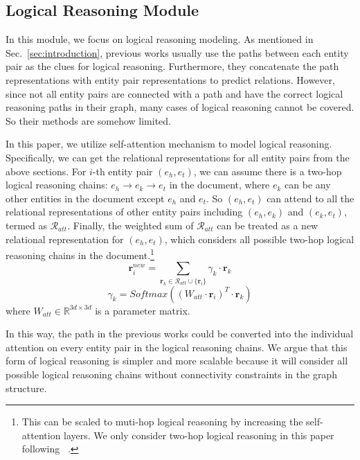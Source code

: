 \documentclass[11pt,a4paper]{article}
\begin{document}
\subsection{Logical Reasoning Module\label{ssec:reasoning}}
In this module, we focus on logical reasoning modeling. As mentioned in Sec.~\ref{sec:introduction}, previous works usually use the paths between each entity pair as the clues for logical reasoning. Furthermore, they concatenate the path representations with entity pair representations to predict relations. However, since not all entity pairs are connected with a path and have the correct logical reasoning paths in their graph, many cases of logical reasoning cannot be covered. So their methods are somehow limited.

In this paper, we utilize self-attention mechanism \citep{transformer} to model logical reasoning. Specifically, we can get the relational representations for all entity pairs from the above sections. For $i$-th entity pair $(e_{h}, e_{t})$, we can assume there is a two-hop logical reasoning chains: $e_{h} \rightarrow e_{k} \rightarrow e_{t}$ in the document, where $e_k$ can be any other entities in the document except $e_h$ and $e_t$. So $(e_{h}, e_{t})$ can attend to all the relational representations of other entity pairs including $(e_{h}, e_{k})$ and $(e_{k}, e_{t})$, termed as $\mathcal{R}_{att}$. Finally, the weighted sum of $\mathcal{R}_{att}$ can be treated as a new relational representation for $(e_{h}, e_{t})$, which considers all possible two-hop logical reasoning chains in the document.\footnote{This can be scaled to muti-hop logical reasoning by increasing the self-attention layers. We only consider two-hop logical reasoning in this paper following ~\citet{GAIN}.}
\begin{equation}
    \textbf{r}^{new}_{i} = \sum_{\textbf{r}_k \in \mathcal{R}_{att} \cup \{\textbf{r}_i\}} \gamma_{k} \cdot \textbf{r}_{k}
\end{equation}
\begin{equation}
    \gamma_{k} = Softmax((W_{att} \cdot \textbf{r}_{i})^T \cdot \textbf{r}_k)
\end{equation}
where  $W_{att} \in \mathbb{R}^{3d \times 3d}$ is a parameter matrix.

In this way, the path in the previous works could be converted into the individual attention on every entity pair in the logical reasoning chains. We argue that this form of logical reasoning is simpler and more scalable because it will consider all possible logical reasoning chains without connectivity constraints in the graph structure. 
\end{document}
